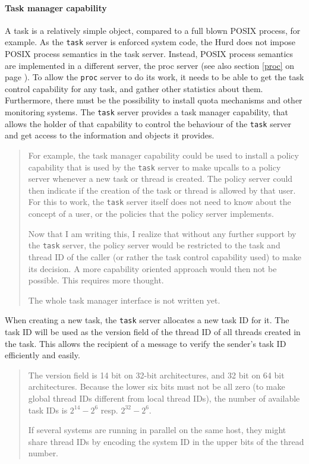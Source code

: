 \documentclass[9pt,a4paper]{extarticle}
\newenvironment{comment}{\footnotesize \begin{quote}}{\end{quote}}
\begin{document}
\paragraph{Task manager capability}
A task is a relatively simple object, compared to a full blown POSIX
process, for example.  As the \texttt{task} server is enforced system
code, the Hurd does not impose POSIX process semantics in the task
server.  Instead, POSIX process semantics are implemented in a
different server, the proc server (see also section \ref{proc} on page
\pageref{proc}).  To allow the \texttt{proc} server to do its work, it
needs to be able to get the task control capability for any task, and
gather other statistics about them.  Furthermore, there must be the
possibility to install quota mechanisms and other monitoring systems.
The \texttt{task} server provides a task manager capability, that
allows the holder of that capability to control the behaviour of the
\texttt{task} server and get access to the information and objects it
provides.

\begin{comment}
  For example, the task manager capability could be used to install a
  policy capability that is used by the \texttt{task} server to make
  upcalls to a policy server whenever a new task or thread is created.
  The policy server could then indicate if the creation of the task or
  thread is allowed by that user.  For this to work, the \texttt{task}
  server itself does not need to know about the concept of a user, or
  the policies that the policy server implements.
  
  Now that I am writing this, I realize that without any further
  support by the \texttt{task} server, the policy server would be
  restricted to the task and thread ID of the caller (or rather the
  task control capability used) to make its decision.  A more
  capability oriented approach would then not be possible.  This
  requires more thought.
  
  The whole task manager interface is not written yet.
\end{comment}

When creating a new task, the \texttt{task} server allocates a new
task ID for it.  The task ID will be used as the version field of the
thread ID of all threads created in the task.  This allows the
recipient of a message to verify the sender's task ID efficiently and
easily.

\begin{comment}
  The version field is 14 bit on 32-bit architectures, and 32 bit on
  64 bit architectures.  Because the lower six bits must not be all
  zero (to make global thread IDs different from local thread IDs),
  the number of available task IDs is $2^{14} - 2^6$ resp. $2^{32} -
  2^6$.
  
  If several systems are running in parallel on the same host, they
  might share thread IDs by encoding the system ID in the upper bits
  of the thread number.
\end{comment}
\end{document}
